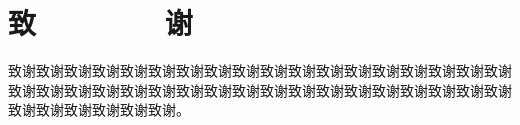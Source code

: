 \section*{致\ \ \ \ \ \ \ \ 谢}

	致谢致谢致谢致谢致谢致谢致谢致谢致谢致谢致谢致谢致谢致谢致谢致谢致谢致谢致谢致谢致谢致谢致谢致谢致谢致谢致谢致谢致谢致谢致谢致谢致谢致谢致谢致谢致谢致谢致谢致谢致谢致谢。\par
	
